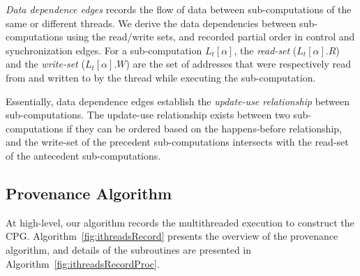   {\em Data dependence edges}  records the flow of data between sub-computations of the same or different threads. 
 We derive the data dependencies between sub-computations using the read/write sets, and recorded partial order in control and synchronization edges. For a sub-computation $L_t[\alpha]$, the {\em read-set}
($L_t[\alpha].R$) and the {\em write-set} ($L_t[\alpha].W$) are the set of
addresses that were respectively read from and written to by
the thread while executing the sub-computation. 

Essentially, data dependence edges establish the {\em update-use relationship} between sub-computations. The update-use relationship exists between two sub-computations if they can be  ordered based on the happens-before relationship, and the write-set of the  precedent  sub-computations intersects with the read-set of the antecedent sub-computations. 







 
 
 \subsection{ Provenance Algorithm}

 
 
At high-level, our algorithm records the multithreaded execution to construct the CPG.
Algorithm~\ref{fig:ithreadsRecord} presents the overview of the provenance algorithm, and details of the subroutines are presented in Algorithm~\ref{fig:ithreadsRecordProc}.
  

